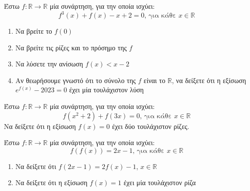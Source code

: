 \documentclass{presentation}
\begin{document}
\begin{askisi}
  Έστω $f:\mathbb{R}\to\mathbb{R}$ μία συνάρτηση, για την οποία ισχύει:
  $$f^3(x)+f(x)-x+2=0\text{, για κάθε } x\in\mathbb{R}$$
  \begin{enumerate}
    \item<1-> Να βρείτε το $f(0)$
    \item<2-> Να βρείτε τις ρίζες και το πρόσημο της $f$
    \item<3-> Να λύσετε την ανίσωση $f(x)<x-2$
    \item<4-> Αν θεωρήσουμε γνωστό ότι το σύνολο της $f$ είναι το $\mathbb{R}$, να δείξετε ότι η εξίσωση $e^{f(x)}-2023=0$ έχει μία τουλάχιστον λύση
  \end{enumerate}

\end{askisi}

\begin{askisi}
  Έστω $f:\mathbb{R}\to\mathbb{R}$ μία συνάρτηση, για την οποία ισχύει:
  $$f(x^2+2)+f(3x)=0 \text{, για κάθε } x\in\mathbb{R}$$
  Να δείξετε ότι η εξίσωση $f(x)=0$ έχει δύο τουλάχιστον ρίζες.

\end{askisi}

\begin{askisi}
  Έστω $f:\mathbb{R}\to\mathbb{R}$ μία συνάρτηση, για την οποία ισχύει:
  $$f\left(f(x)\right)=2x-1\text{, για κάθε } x\in\mathbb{R}$$
  \begin{enumerate}
    \item<1-> Να δείξετε ότι $f(2x-1)=2f(x)-1$, $x\in\mathbb{R}$
    \item<2-> Να δείξετε ότι η εξίσωση $f(x)=1$ έχει μία τουλάχιστον ρίζα
  \end{enumerate}

\end{askisi}
\end{document}
